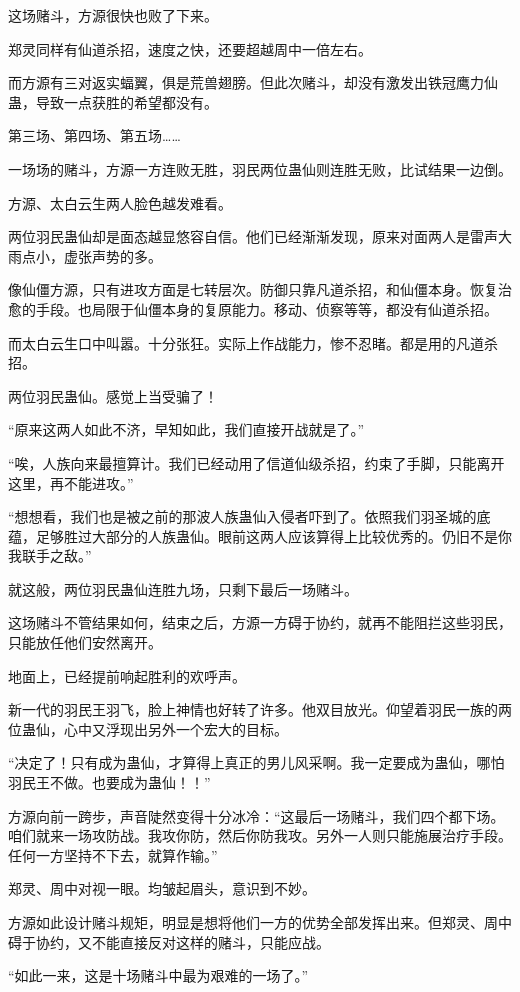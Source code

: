 \begin{this_body}
这场赌斗，方源很快也败了下来。

郑灵同样有仙道杀招，速度之快，还要超越周中一倍左右。

而方源有三对返实蝠翼，俱是荒兽翅膀。但此次赌斗，却没有激发出铁冠鹰力仙蛊，导致一点获胜的希望都没有。

第三场、第四场、第五场……

一场场的赌斗，方源一方连败无胜，羽民两位蛊仙则连胜无败，比试结果一边倒。

方源、太白云生两人脸色越发难看。

两位羽民蛊仙却是面态越显悠容自信。他们已经渐渐发现，原来对面两人是雷声大雨点小，虚张声势的多。

像仙僵方源，只有进攻方面是七转层次。防御只靠凡道杀招，和仙僵本身。恢复治愈的手段。也局限于仙僵本身的复原能力。移动、侦察等等，都没有仙道杀招。

而太白云生口中叫嚣。十分张狂。实际上作战能力，惨不忍睹。都是用的凡道杀招。

两位羽民蛊仙。感觉上当受骗了！

“原来这两人如此不济，早知如此，我们直接开战就是了。”

“唉，人族向来最擅算计。我们已经动用了信道仙级杀招，约束了手脚，只能离开这里，再不能进攻。”

“想想看，我们也是被之前的那波人族蛊仙入侵者吓到了。依照我们羽圣城的底蕴，足够胜过大部分的人族蛊仙。眼前这两人应该算得上比较优秀的。仍旧不是你我联手之敌。”

就这般，两位羽民蛊仙连胜九场，只剩下最后一场赌斗。

这场赌斗不管结果如何，结束之后，方源一方碍于协约，就再不能阻拦这些羽民，只能放任他们安然离开。

地面上，已经提前响起胜利的欢呼声。

新一代的羽民王羽飞，脸上神情也好转了许多。他双目放光。仰望着羽民一族的两位蛊仙，心中又浮现出另外一个宏大的目标。

“决定了！只有成为蛊仙，才算得上真正的男儿风采啊。我一定要成为蛊仙，哪怕羽民王不做。也要成为蛊仙！！”

方源向前一跨步，声音陡然变得十分冰冷：“这最后一场赌斗，我们四个都下场。咱们就来一场攻防战。我攻你防，然后你防我攻。另外一人则只能施展治疗手段。任何一方坚持不下去，就算作输。”

郑灵、周中对视一眼。均皱起眉头，意识到不妙。

方源如此设计赌斗规矩，明显是想将他们一方的优势全部发挥出来。但郑灵、周中碍于协约，又不能直接反对这样的赌斗，只能应战。

“如此一来，这是十场赌斗中最为艰难的一场了。”


\end{this_body}

